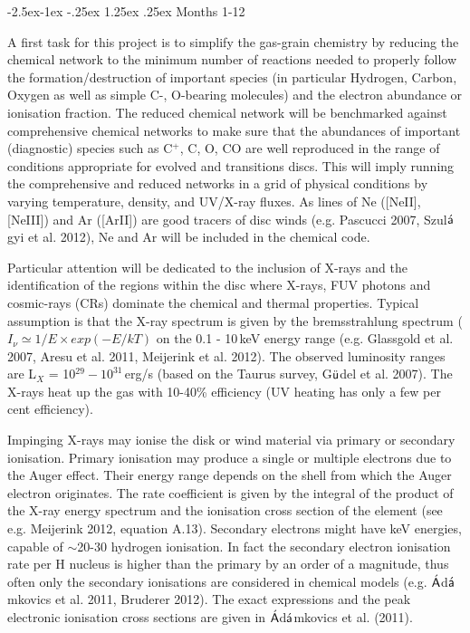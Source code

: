 \documentclass[10pt,fleqn,twoside]{article}
\makeatletter
\renewcommand\paragraph{\@startsection{paragraph}{4}{\z@}%
            {-2.5ex\@plus -1ex \@minus -.25ex}%
            {1.25ex \@plus .25ex}%
            {\normalfont\normalsize\bfseries}}
\makeatother
\begin{document}
\paragraph{Months 1-12}

 A first task for this project is to simplify the gas-grain chemistry by reducing the chemical network to the minimum number of reactions needed to properly follow the formation/destruction of important species (in particular Hydrogen, Carbon, Oxygen as well as simple C-, O-bearing molecules) and the electron abundance or ionisation fraction. 
The reduced chemical network will be benchmarked against comprehensive chemical networks to make sure that the abundances of  important (diagnostic) species such as C$^+$, C, O, CO are well reproduced in the range of conditions appropriate for evolved and
transitions discs. This will imply running the comprehensive and reduced networks in a grid of physical conditions by varying temperature, density, and UV/X-ray fluxes.  As lines of Ne ([NeII], [NeIII]) and Ar ([ArII]) are good tracers of disc winds (e.g. Pascucci 2007, Szul$\acute{\textsf a}$gyi et al. 2012), Ne and Ar will be included in the chemical code. 

Particular attention will be dedicated to the inclusion of X-rays and the identification of the regions within the disc where X-rays, FUV photons and cosmic-rays (CRs) dominate the chemical and thermal properties. Typical assumption is that the X-ray spectrum is given by the bremsstrahlung spectrum ($I_{\nu} \simeq 1/E \times exp(-E/kT)$ on the 0.1 - 10\,keV energy range (e.g. Glassgold et al. 2007, Aresu et al. 2011, Meijerink et al. 2012). The observed luminosity ranges are L$_X$ = 10$^{29} - 10^{31}$\,erg/s (based on the Taurus survey, G$\ddot{\textsf u}$del et al. 2007). The X-rays heat up the gas with 10-40\% efficiency (UV heating has only a few per cent efficiency). 

Impinging X-rays may ionise the disk or wind material via primary or secondary ionisation. Primary ionisation may produce a single or multiple electrons due to the Auger effect. Their energy range depends on the shell from which  the Auger electron originates. The rate coefficient is given by the integral of the product of the X-ray energy spectrum and the ionisation cross section of the element (see e.g. Meijerink 2012, equation A.13). Secondary electrons might have keV energies, capable of $\sim$20-30 hydrogen ionisation. In fact the secondary electron ionisation rate per H nucleus is higher than the primary by an order of a magnitude, thus often only the secondary ionisations are considered in chemical models (e.g. $\acute{\textsf A}$d$\acute{\textsf a}$mkovics et al. 2011, Bruderer 2012).
The exact expressions and the peak electronic ionisation cross sections are given in $\acute{\textsf A}$d$\acute{\textsf a}$mkovics et al. (2011). 
\end{document}
